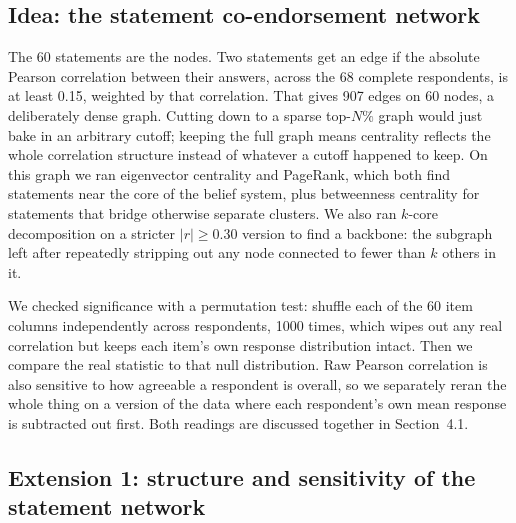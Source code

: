\documentclass[11pt]{article}
\begin{document}
\subsection{Idea: the statement co-endorsement network}

The 60 statements are the nodes. Two statements get an edge if the absolute Pearson correlation
between their answers, across the 68 complete respondents, is at least 0.15, weighted by that
correlation. That gives 907 edges on 60 nodes, a deliberately dense graph. Cutting down to a sparse
top-$N\%$ graph would just bake in an arbitrary cutoff; keeping the full graph means centrality
reflects the whole correlation structure instead of whatever a cutoff happened to keep. On this graph
we ran eigenvector centrality and PageRank, which both find statements near the core of the belief
system, plus betweenness centrality for statements that bridge otherwise separate clusters. We also
ran $k$-core decomposition on a stricter $|r| \geq 0.30$ version to find a backbone: the subgraph left
after repeatedly stripping out any node connected to fewer than $k$ others in it.

We checked significance with a permutation test: shuffle each of the 60 item columns independently
across respondents, 1000 times, which wipes out any real correlation but keeps each item's own
response distribution intact. Then we compare the real statistic to that null distribution. Raw
Pearson correlation is also sensitive to how agreeable a respondent is overall, so we separately
reran the whole thing on a version of the data where each respondent's own mean response is
subtracted out first. Both readings are discussed together in Section~4.1.

\subsection{Extension 1: structure and sensitivity of the statement network}
\end{document}
